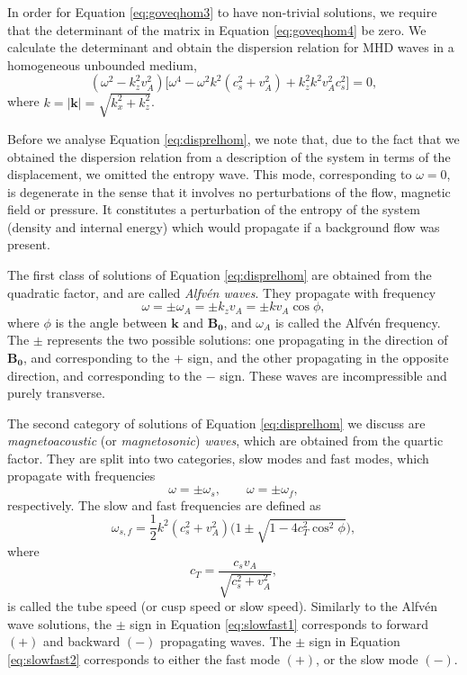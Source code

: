 %
In order for Equation \eqref{eq:goveqhom3} to have non-trivial solutions, we require that the determinant of the matrix in Equation \eqref{eq:goveqhom4} be zero.
We calculate the determinant and obtain the dispersion relation for MHD waves in a homogeneous unbounded medium,
%
\begin{equation}
\label{eq:disprelhom}
(\omega^2 - k_z^2 v_A^2)
\big[
\omega^4 - \omega^2 k^2 (c_s^2 + v_A^2)
+ k_z^2 k^2 v_A^2 c_s^2
\big]
= 0,
\end{equation}
%
where $k = |\mathbf{k}| = \sqrt{k_x^2 + k_z^2}$.

Before we analyse Equation \eqref{eq:disprelhom}, we note that, due to the fact that we obtained the dispersion relation from a description of the system in terms of the displacement, we omitted the entropy wave.
This mode, corresponding to $\omega = 0$, is degenerate in the sense that it involves no perturbations of the flow, magnetic field or pressure.
It constitutes a perturbation of the entropy of the system (density and internal energy) which would propagate if a background flow was present.

The first class of solutions of Equation \eqref{eq:disprelhom} are obtained from the quadratic factor, and are called \textit{Alfv\'en waves}.
They propagate with frequency
%
\begin{equation}
\label{eq:alfvenhom}
\omega = \pm \omega_A = \pm k_z v_A = \pm k v_A \cos \phi,
\end{equation}
%
where $\phi$ is the angle between $\mathbf{k}$ and $\mathbf{B_0}$, and $\omega_A$ is called the Alfv\'en frequency.
The $\pm$ represents the two possible solutions: one propagating in the direction of $\mathbf{B_0}$, and corresponding to the $+$ sign, and the other propagating in the opposite direction, and corresponding to the $-$ sign.
These waves are incompressible and purely transverse.

The second category of solutions of Equation \eqref{eq:disprelhom} we discuss are \textit{magnetoacoustic} (or \textit{magnetosonic}) \textit{waves}, which are obtained from the quartic factor.
They are split into two categories, slow modes and fast modes, which propagate with frequencies
%
\begin{equation}
\label{eq:slowfast1}
\omega = \pm \omega_s, \qquad \omega = \pm \omega_f,
\end{equation}
%
respectively.
The slow and fast frequencies are defined as
%
\begin{equation}
\label{eq:slowfast2}
\omega_{s, f} = \frac{1}{2} k^2 (c_s^2 + v_A^2)
\big( 1 \pm \sqrt{1 - 4 c_T^2 \cos^2 \phi} \big),
\end{equation}
%
where
%
\begin{equation}
\label{eq:tubespeed}
c_T = \frac{c_s v_A}{\sqrt{c_s^2 + v_A^2}},
\end{equation}
%
is called the tube speed (or cusp speed or slow speed).
Similarly to the Alfv\'en wave solutions, the $\pm$ sign in Equation \eqref{eq:slowfast1} corresponds to forward $(+)$ and backward $(-)$ propagating waves.
The $\pm$ sign in Equation \eqref{eq:slowfast2} corresponds to either the fast mode $(+)$, or the slow mode $(-)$.

